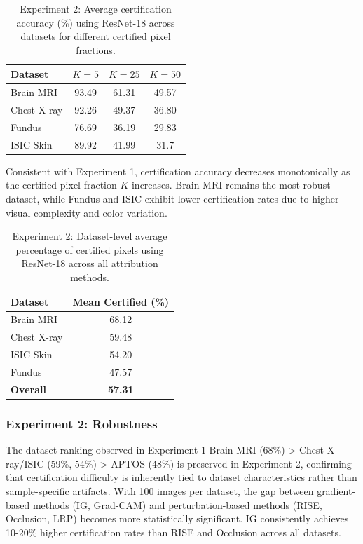 \documentclass[11pt]{article}
\begin{document}
\begin{table}[H]
\centering
\caption{Experiment 2: Average certification accuracy (\%) using ResNet-18 across datasets for different certified pixel fractions.}
\label{tab:exp2_kwise}
\begin{tabular}{lccc}
\toprule
\textbf{Dataset} & $K=5$ & $K=25$ & $K=50$ \\
\midrule
Brain MRI   & 93.49 & 61.31 & 49.57 \\
Chest X-ray & 92.26 & 49.37 & 36.80 \\
Fundus     & 76.69 & 36.19 & 29.83 \\
ISIC Skin  & 89.92 & 41.99 & 31.7 \\
\bottomrule
\end{tabular}
\end{table}

Consistent with Experiment 1, certification accuracy decreases monotonically as the certified pixel fraction $K$ increases. Brain MRI remains the most robust dataset, while Fundus and ISIC exhibit lower certification rates due to higher visual complexity and color variation.

\begin{table}[h!]
\centering
\caption{Experiment 2: Dataset-level average percentage of certified pixels using ResNet-18 across all attribution methods.}
\label{tab:exp2_dataset_avg}
\begin{tabular}{lc}
\toprule
\textbf{Dataset} & \textbf{Mean Certified (\%)} \\
\midrule
Brain MRI   & 68.12 \\
Chest X-ray & 59.48 \\
ISIC Skin  & 54.20 \\
Fundus     & 47.57 \\
\midrule
\textbf{Overall} & \textbf{57.31} \\
\bottomrule
\end{tabular}
\end{table}




\subsubsection{Experiment 2: Robustness}

The dataset ranking observed in Experiment 1 Brain MRI (68\%) > Chest X-ray/ISIC (59\%, 54\%) > APTOS (48\%) is preserved in Experiment 2, confirming that certification difficulty is inherently tied to dataset characteristics rather than sample-specific artifacts. With 100 images per dataset, the gap between gradient-based methods (IG, Grad-CAM) and perturbation-based methods (RISE, Occlusion, LRP) becomes more statistically significant. IG consistently achieves 10-20\% higher certification rates than RISE and Occlusion across all datasets.
\end{document}
